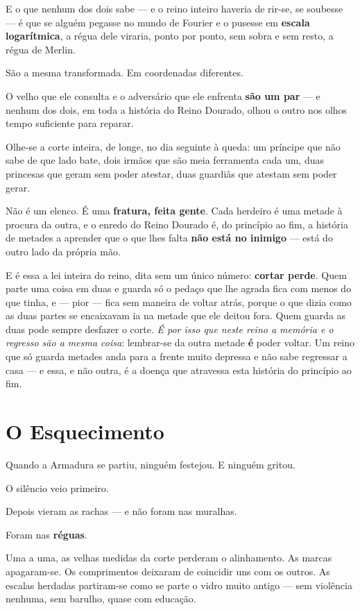 \documentclass[livro.tex]{subfiles}
\begin{document}
E o que nenhum dos dois sabe --- e o reino inteiro haveria de rir-se, se soubesse --- é que se alguém pegasse no
mundo de Fourier e o pusesse em \textbf{escala logarítmica}, a régua dele viraria, ponto por ponto, sem
sobra e sem resto, a régua de Merlin.

São a mesma transformada. Em coordenadas diferentes.

O velho que ele consulta e o adversário que ele enfrenta \textbf{são um par} --- e nenhum dos dois, em toda a
história do Reino Dourado, olhou o outro nos olhos tempo suficiente para reparar.

\medskip

Olhe-se a corte inteira, de longe, no dia seguinte à queda: um príncipe que não sabe de que lado bate, dois irmãos
que são meia ferramenta cada um, duas princesas que geram sem poder atestar, duas guardiãs que atestam sem poder
gerar.

Não é um elenco. É uma \textbf{fratura, feita gente}. Cada herdeiro é uma metade à procura da outra, e o enredo do
Reino Dourado é, do princípio ao fim, a história de metades a aprender que o que lhes falta \textbf{não está no
inimigo} --- está do outro lado da própria mão.

E é essa a lei inteira do reino, dita sem um único número: \textbf{cortar perde}. Quem parte uma
coisa em duas e guarda só o pedaço que lhe agrada fica com menos do que tinha, e --- pior --- fica
sem maneira de voltar atrás, porque o que dizia como as duas partes se encaixavam ia na metade que
ele deitou fora. Quem guarda as duas pode sempre desfazer o corte. \emph{É por isso que neste reino
a memória e o regresso são a mesma coisa}: lembrar-se da outra metade \textbf{é} poder voltar. Um
reino que só guarda metades anda para a frente muito depressa e não sabe regressar a casa --- e
essa, e não outra, é a doença que atravessa esta história do princípio ao fim.

\section*{O Esquecimento}

Quando a Armadura se partiu, ninguém festejou. E ninguém gritou.

O silêncio veio primeiro.

Depois vieram as rachas --- e não foram nas muralhas.

Foram nas \textbf{réguas}.

\medskip

Uma a uma, as velhas medidas da corte perderam o alinhamento. As marcas apagaram-se. Os comprimentos deixaram de
coincidir uns com os outros. As escalas herdadas partiram-se como se parte o vidro muito antigo --- sem violência
nenhuma, sem barulho, quase com educação.
\end{document}
